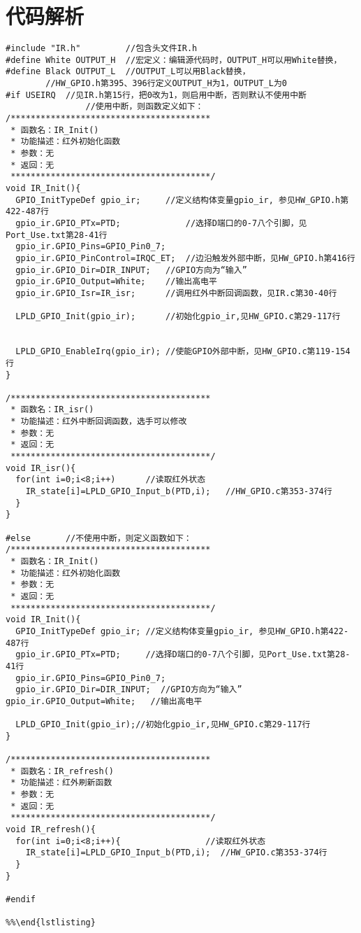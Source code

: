 \section{代码解析}
\lstset{language=C}
\begin{verbatim}
#include "IR.h"			//包含头文件IR.h
#define White OUTPUT_H	//宏定义：编辑源代码时，OUTPUT_H可以用White替换，
#define Black OUTPUT_L	//OUTPUT_L可以用Black替换，
		//HW_GPIO.h第395、396行定义OUTPUT_H为1，OUTPUT_L为0
#if USEIRQ	//见IR.h第15行，把0改为1，则启用中断，否则默认不使用中断
				//使用中断，则函数定义如下：
/****************************************
 * 函数名：IR_Init()
 * 功能描述：红外初始化函数
 * 参数：无
 * 返回：无
 ****************************************/
void IR_Init(){
  GPIO_InitTypeDef gpio_ir;		//定义结构体变量gpio_ir, 参见HW_GPIO.h第422-487行
  gpio_ir.GPIO_PTx=PTD;				//选择D端口的0-7八个引脚，见Port_Use.txt第28-41行
  gpio_ir.GPIO_Pins=GPIO_Pin0_7;
  gpio_ir.GPIO_PinControl=IRQC_ET;	//边沿触发外部中断，见HW_GPIO.h第416行
  gpio_ir.GPIO_Dir=DIR_INPUT;	//GPIO方向为“输入”
  gpio_ir.GPIO_Output=White;	//输出高电平
  gpio_ir.GPIO_Isr=IR_isr;		//调用红外中断回调函数，见IR.c第30-40行

  LPLD_GPIO_Init(gpio_ir);		//初始化gpio_ir,见HW_GPIO.c第29-117行


  LPLD_GPIO_EnableIrq(gpio_ir);	//使能GPIO外部中断，见HW_GPIO.c第119-154行
}

/****************************************
 * 函数名：IR_isr()
 * 功能描述：红外中断回调函数，选手可以修改
 * 参数：无
 * 返回：无
 ****************************************/
void IR_isr(){
  for(int i=0;i<8;i++)		//读取红外状态
    IR_state[i]=LPLD_GPIO_Input_b(PTD,i);	//HW_GPIO.c第353-374行
  }
}

#else		//不使用中断，则定义函数如下：
/****************************************
 * 函数名：IR_Init()
 * 功能描述：红外初始化函数
 * 参数：无
 * 返回：无
 ****************************************/
void IR_Init(){
  GPIO_InitTypeDef gpio_ir;	//定义结构体变量gpio_ir, 参见HW_GPIO.h第422-487行
  gpio_ir.GPIO_PTx=PTD;		//选择D端口的0-7八个引脚，见Port_Use.txt第28-41行
  gpio_ir.GPIO_Pins=GPIO_Pin0_7;
  gpio_ir.GPIO_Dir=DIR_INPUT;  //GPIO方向为“输入”
gpio_ir.GPIO_Output=White;	 //输出高电平

  LPLD_GPIO_Init(gpio_ir);//初始化gpio_ir,见HW_GPIO.c第29-117行
}

/****************************************
 * 函数名：IR_refresh()
 * 功能描述：红外刷新函数
 * 参数：无
 * 返回：无
 ****************************************/
void IR_refresh(){
  for(int i=0;i<8;i++){ 				//读取红外状态
    IR_state[i]=LPLD_GPIO_Input_b(PTD,i);  //HW_GPIO.c第353-374行
  }
}

#endif

%%\end{lstlisting}
\end{verbatim}

